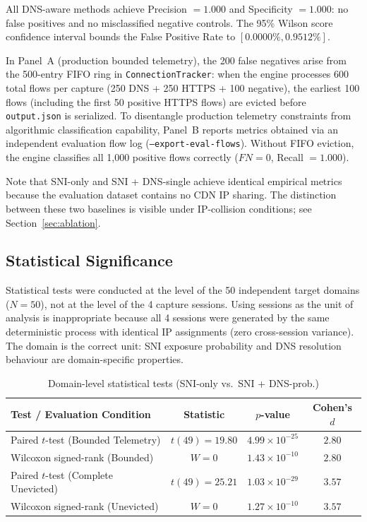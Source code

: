\documentclass[conference]{IEEEtran}
\begin{document}
All DNS-aware methods achieve Precision $= 1.000$ and
Specificity $= 1.000$: no false positives and no misclassified
negative controls.  The 95\% Wilson score confidence interval bounds
the False Positive Rate to $[0.0000\%, 0.9512\%]$.

In Panel~A (production bounded telemetry), the 200 false negatives
arise from the 500-entry FIFO ring in \texttt{ConnectionTracker}:
when the engine processes 600 total flows per capture (250 DNS +
250 HTTPS + 100 negative), the earliest 100 flows (including the
first 50 positive HTTPS flows) are evicted before \texttt{output.json}
is serialized.  To disentangle production telemetry constraints from
algorithmic classification capability, Panel~B reports metrics
obtained via an independent evaluation flow log
(\texttt{--export-eval-flows}).  Without FIFO eviction, the engine
classifies all 1,000 positive flows correctly ($FN = 0$, Recall $= 1.000$).

Note that SNI-only and SNI + DNS-single achieve identical empirical
metrics because the evaluation dataset contains no CDN IP sharing.
The distinction between these two baselines is visible under
IP-collision conditions; see Section~\ref{sec:ablation}.

\subsection{Statistical Significance}
\label{sec:stats}

Statistical tests were conducted at the level of the 50 independent
target domains ($N=50$), not at the level of the 4 capture sessions.
Using sessions as the unit of analysis is inappropriate because
all 4 sessions were generated by the same deterministic process
with identical IP assignments (zero cross-session variance).
The domain is the correct unit: SNI exposure probability and
DNS resolution behaviour are domain-specific properties.

\begin{table}[!t]
\centering
\caption{Domain-level statistical tests (SNI-only vs.\ SNI + DNS-prob.)}
\label{tab:stats}
\scriptsize
\begin{tabular}{|l|c|c|c|}
\hline
\textbf{Test / Evaluation Condition} & \textbf{Statistic} & \textbf{$p$-value} & \textbf{Cohen's $d$} \\
\hline
Paired $t$-test (Bounded Telemetry) & $t(49) = 19.80$ & $4.99 \times 10^{-25}$ & $2.80$ \\
\hline
Wilcoxon signed-rank (Bounded) & $W = 0$ & $1.43 \times 10^{-10}$ & $2.80$ \\
\hline
Paired $t$-test (Complete Unevicted) & $t(49) = 25.21$ & $1.03 \times 10^{-29}$ & $3.57$ \\
\hline
Wilcoxon signed-rank (Unevicted) & $W = 0$ & $1.27 \times 10^{-10}$ & $3.57$ \\
\hline
\end{tabular}
\end{table}
\end{document}

